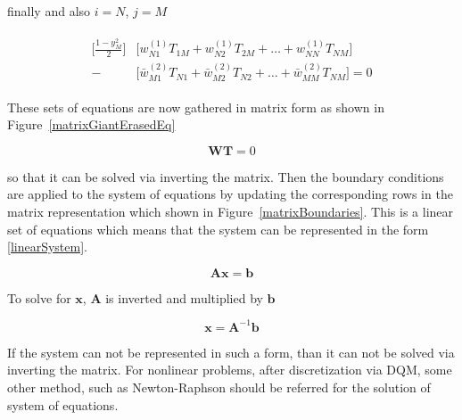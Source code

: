 finally and also $i=N$, $j=M$

\begin{align}
\begin{split} \label{DQMApplyExampleDiscretized2}
\bigg[\frac{1-y_M^2}{2} \bigg]  & \bigg[w_{N1}^{(1)} T_{1M} + w_{N2}^{(1)} T_{2M} + \dots + w_{NN}^{(1)} T_{NM}\bigg] \\
 -  & \bigg[\bar{w}_{M1}^{(2)} T_{N1} + \bar{w}_{M2}^{(2)} T_{N2} + \dots + \bar{w}_{MM}^{(2)} T_{NM}\bigg]=0
\end{split}
\end{align}

These sets of equations are now gathered in matrix form as shown in Figure~\ref{matrixGiantErasedEq} 

\begin{equation} \label{equ24}
\bm{W} \bm{T} = 0
\end{equation}

so that it can be solved via inverting the matrix. Then the boundary conditions are applied to the system of equations by updating the corresponding rows in the matrix representation which shown in Figure~\ref{matrixBoundaries}. This is a linear set of equations which means that the system can be represented in the form \eqref{linearSystem}.

\begin{equation} \label{linearSystem}
\bm{A} \bm{x} = \bm{b}
\end{equation}

To solve for $\bm{x}$, $\bm{A}$ is inverted and multiplied by $\bm{b}$

\begin{equation} \label{solveLinearSystem}
 \bm{x} = \bm{A}^{-1} \bm{b}
\end{equation}

If the system can not be represented in such a form, than it can not be solved via inverting the matrix. For nonlinear problems, after discretization via DQM, some other method, such as Newton-Raphson should be referred for the solution of system of equations.

